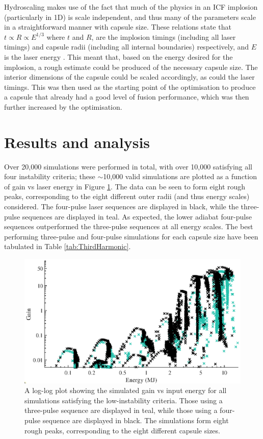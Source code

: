 Hydroscaling makes use of the fact that much of the physics in an ICF implosion (particularly in 1D) is scale independent, and thus many of the parameters scale in a straightforward manner with capsule size. These relations state that $t \propto R \propto E^{1/3}$ where $t$ and $R$, are the implosion timings (including all laser timings) and capsule radii (including all internal boundaries) respectively, and $E$ is the laser energy \cite{Nora2014}. This meant that, based on the energy desired for the implosion, a rough estimate could be produced of the necessary capsule size. The interior dimensions of the capsule could be scaled accordingly, as could the laser timings. This was then used as the starting point of the optimisation to produce a capsule that already had a good level of fusion performance, which was then further increased by the optimisation.

\section{Results and analysis} \label{sec: LowCRResults}

Over 20,000 simulations were performed in total, with over 10,000 satisfying all four instability criteria; these $\sim$10,000 valid simulations are plotted as a function of gain vs laser energy in Figure \ref{fig:loglog}. The data can be seen to form eight rough peaks, corresponding to the eight different outer radii (and thus energy scales) considered. The four-pulse laser sequences are displayed in black, while the three-pulse sequences are displayed in teal. As expected, the lower adiabat four-pulse sequences outperformed the three-pulse sequences at all energy scales. The best performing three-pulse and four-pulse simulations for each capsule size have been tabulated in Table \ref{tab:ThirdHarmonic}. 

\begin{figure}[ht!]
\centering
\includegraphics{figures/LowCR/AllData_full.eps}
\caption{A log-log plot showing the simulated gain vs input energy for all simulations satisfying the low-instability criteria. Those using a three-pulse sequence are displayed in teal, while those using a four-pulse sequence are displayed in black. The simulations form eight rough peaks, corresponding to the eight different capsule sizes.}
\label{fig:loglog}
\end{figure}


